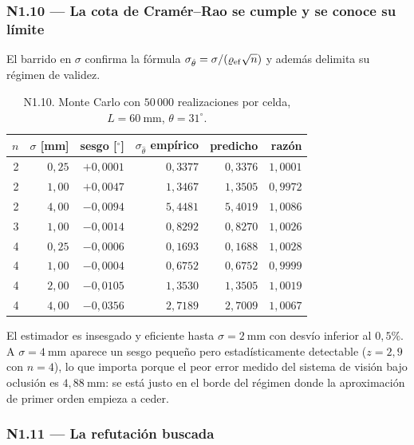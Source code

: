 \documentclass[11pt,a4paper]{article}
\newcommand{\grados}{^{\circ}}
\begin{document}
\subsubsection{N1.10 --- La cota de Cramér--Rao se cumple y se conoce su límite}

El barrido en $\sigma$ confirma la fórmula $\sigma_{\hat\theta}=\sigma/(\varrho_{\rm ef}\sqrt n)$
y además delimita su régimen de validez.

\begin{table}[htbp]
\centering
\small
\caption{N1.10. Monte Carlo con $50\,000$ realizaciones por celda,
$L=60\ \mathrm{mm}$, $\theta=31\grados$.}
\begin{tabular}{rrrrrr}
\toprule
$n$ & $\sigma$ [mm] & sesgo [$\grados$] & $\sigma_{\hat\theta}$ empírico & predicho & razón \\
\midrule
2 & $0{,}25$ & $+0{,}0001$ & $0{,}3377$ & $0{,}3376$ & $1{,}0001$ \\
2 & $1{,}00$ & $+0{,}0047$ & $1{,}3467$ & $1{,}3505$ & $0{,}9972$ \\
2 & $4{,}00$ & $-0{,}0094$ & $5{,}4481$ & $5{,}4019$ & $1{,}0086$ \\
3 & $1{,}00$ & $-0{,}0014$ & $0{,}8292$ & $0{,}8270$ & $1{,}0026$ \\
4 & $0{,}25$ & $-0{,}0006$ & $0{,}1693$ & $0{,}1688$ & $1{,}0028$ \\
4 & $1{,}00$ & $-0{,}0004$ & $0{,}6752$ & $0{,}6752$ & $0{,}9999$ \\
4 & $2{,}00$ & $-0{,}0105$ & $1{,}3530$ & $1{,}3505$ & $1{,}0019$ \\
4 & $4{,}00$ & $-0{,}0356$ & $2{,}7189$ & $2{,}7009$ & $1{,}0067$ \\
\bottomrule
\end{tabular}
\end{table}

El estimador es insesgado y eficiente hasta $\sigma = 2\ \mathrm{mm}$ con desvío inferior
al $0{,}5\%$. A $\sigma = 4\ \mathrm{mm}$ aparece un sesgo pequeño pero estadísticamente
detectable ($z = 2{,}9$ con $n=4$), lo que importa porque el peor error medido del
sistema de visión bajo oclusión es $4{,}88\ \mathrm{mm}$: se está justo en el borde del
régimen donde la aproximación de primer orden empieza a ceder.

\subsubsection{N1.11 --- La refutación buscada}
\end{document}
